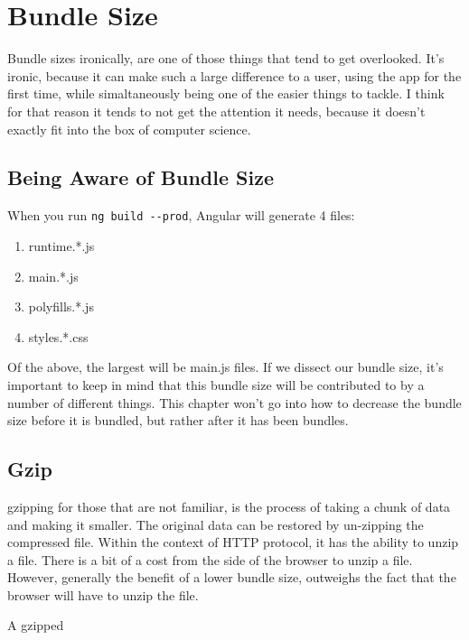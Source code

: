 \section{Bundle Size}
\maketitle{}

Bundle sizes ironically, are one of those things that tend to get overlooked. 
It's ironic, because it can make such a large difference to a user, using the
app for the first time, while simaltaneously being one of the easier things to 
tackle. I think for that reason it tends to not get the attention it needs,
because it doesn't exactly fit into the box of computer science.

\subsection{Being Aware of Bundle Size}
When you run \lstinline{ng build --prod}, Angular will generate 4 files: 
\begin{enumerate}
  \item runtime.*.js
  \item main.*.js
  \item polyfills.*.js
  \item styles.*.css
\end{enumerate}

Of the above, the largest will be main.js files. If we dissect our bundle size, 
it's important to keep in mind that this bundle size will be contributed to by 
a number of different things. This chapter won't go into how to decrease the 
bundle size before it is bundled, but rather after it has been bundles. 

\subsection{Gzip}
gzipping for those that are not familiar, is the process of taking a chunk of 
data and making it smaller. The original data can be restored by un-zipping the
compressed file. Within the context of HTTP protocol, it has the ability to
unzip a file. There is a bit of a cost from the side of the browser to unzip a 
file. However, generally the benefit of a lower bundle size, outweighs the fact
that the browser will have to unzip the file.

A gzipped 